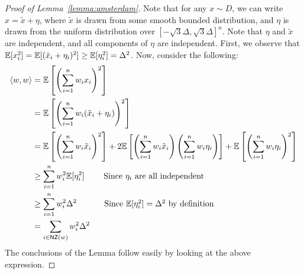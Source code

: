 \begin{proof}[Proof of Lemma~\ref{lemma:amsterdam}] Note that for any $x \sim
D$, we can write $x = \tilde{x} + \eta$, where $\tilde{x}$ is drawn from some
smooth bounded distribution, and $\eta$ is drawn from the uniform distribution
over $[-\sqrt{3} \Delta, \sqrt{3} \Delta]^n$. Note that $\eta$ and $\tilde{x}$
are independent, and all components of $\eta$ are independent. First, we observe
that $\mathbb{E}[x_i^2] = \mathbb{E}[(\tilde{x}_i + \eta_i)^2] \geq \mathbb{E}[\eta_i^2] = \Delta^2$.
Now, consider the following:
\begin{align*}
\langle w, w \rangle &= \mathbb{E}\left[\left(\sum_{i=1}^n w_i x_i\right)^2\right] \\
&= \mathbb{E}\left[\left(\sum_{i = 1}^n w_i (\tilde{x}_i + \eta_i) \right)^2 \right] \\ 
&= \mathbb{E}\left[\left(\sum_{i=1}^n w_i \tilde{x}_i\right)^2\right] +
2\mathbb{E}\left[\left(\sum_{i=1}^n w_i \tilde{x}_i \right)\left(\sum_{i=1}^n w_i
\eta_i\right) \right] + \mathbb{E}\left[\left(\sum_{i=1}^n w_i \eta_i\right)^2\right] \\
&\geq \sum_{i=1}^n w_i^2 \mathbb{E}[\eta_i^2] \mbox{~~~~~~~Since $\eta_i$ are all independent}
\\
&\geq \sum_{i = 1}^n w_i^2 \Delta^2  \mbox{~~~~~~~~~~Since $\mathbb{E}[\eta_i^2] = \Delta^2$ by
definition} \\
&= \sum_{i \in \mathsf{NZ}(w)} w_i^2 \Delta^2
\end{align*}
The conclusions of the Lemma follow easily by looking at the above expression.
\end{proof}
